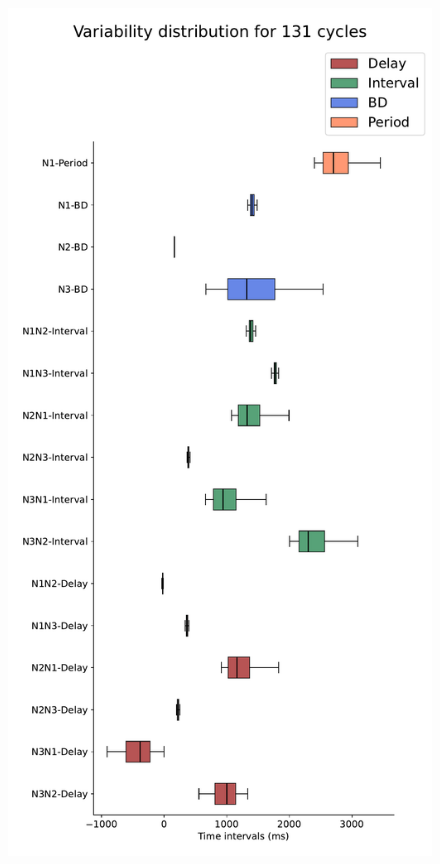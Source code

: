 

\begin{figure}[hbt!]
	\begin{minipage}[b]{0.45\textwidth}
		\centering
		\includegraphics[width=\textwidth]{invariants/data/MODEL/n3t_driven/images/3phases/_boxplot.pdf}

\end{minipage}
\end{figure}
